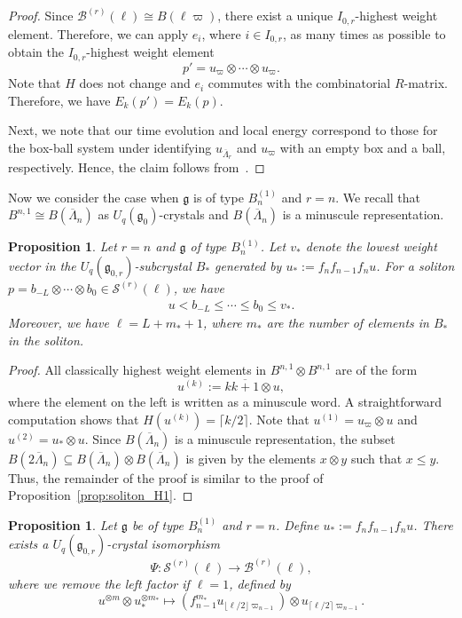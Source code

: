 \documentclass[reqno]{amsart}
\newcommand{\g}{\mathfrak{g}}
\newcommand{\clfw}{\overline{\Lambda}} %
\newcommand{\iso}{\cong}
\newcommand{\Sol}{\mathcal{S}} %
\theoremstyle{plain}
\newtheorem{prop}[thm]{Proposition}
\theoremstyle{definition}
\numberwithin{equation}{section}
\begin{document}
\begin{proof}
Since $\mathcal{B}^{(r)}(\ell) \iso B(\ell \varpi)$, there exist a unique $I_{0,r}$-highest weight element.
Therefore, we can apply $e_i$, where $i \in I_{0,r}$, as many times as possible to obtain the $I_{0,r}$-highest weight element
\[
p' = u_{\varpi} \otimes \cdots \otimes u_{\varpi}.
\]
Note that $H$ does not change and $e_i$ commutes with the combinatorial $R$-matrix.
Therefore, we have $E_k(p') = E_k(p)$.

Next, we note that our time evolution and local energy correspond to those for the box-ball system under identifying $u_{\clfw_r}$ and $u_{\varpi}$ with an empty box and a ball, respectively.
Hence, the claim follows from~\cite[Lemma~4.1]{FOY00}.
\end{proof}

Now we consider the case when $\g$ is of type $B_n^{(1)}$ and $r = n$.
We recall that $B^{n,1} \iso B(\clfw_n)$ as $U_q(\g_0)$-crystals and $B(\clfw_n)$ is a minuscule representation.

\begin{prop}
\label{prop:soliton_Bn}
Let $r = n$ and $\g$ of type $B_n^{(1)}$.
Let $v_*$ denote the lowest weight vector in the $U_q(\g_{0,r})$-subcrystal $B_*$ generated by $u_* := f_n f_{n-1} f_n u$.
For a soliton $p = b_{-L} \otimes \cdots \otimes b_0 \in \Sol^{(r)}(\ell)$, we have
\begin{align*}
u < b_{-L} \leq \cdots \leq b_0 \leq v_*.
\end{align*}
Moreover, we have $\ell = L + m_* + 1$, where $m_*$ are the number of elements in $B_*$ in the soliton. 
\end{prop}

\begin{proof}
All classically highest weight elements in $B^{n,1} \otimes B^{n,1}$ are of the form
\[
u^{(k)} := k \overline{k+1} \otimes u,
\]
where the element on the left is written as a minuscule word.
A straightforward computation shows that $H(u^{(k)}) = \lceil k / 2 \rceil$.
Note that $u^{(1)} = u_{\varpi} \otimes u$ and $u^{(2)} = u_* \otimes u$.
Since $B(\clfw_n)$ is a minuscule representation, the subset $B(2\clfw_n) \subseteq B(\clfw_n) \otimes B(\clfw_n)$ is given by the elements $x \otimes y$ such that $x \leq y$.
Thus, the remainder of the proof is similar to the proof of Proposition~\ref{prop:soliton_H1}.
\end{proof}

\begin{prop}
\label{prop:soliton_crystal_bijection_B}
Let $\g$ be of type $B_n^{(1)}$ and $r = n$.
Define $u_* := f_n f_{n-1} f_n u$.
There exists a $U_q(\g_{0,r})$-crystal isomorphism
\[
\Psi \colon \Sol^{(r)}(\ell) \to \mathcal{B}^{(r)}(\ell), %
\]
where we remove the left factor if $\ell = 1$,
defined by
\[
u^{\otimes m} \otimes u_*^{\otimes m_*} \mapsto (f_{n-1}^{m_*} u_{\lfloor \ell / 2 \rfloor \varpi_{n-1}}) \otimes u_{\lceil \ell / 2 \rceil \varpi_{n-1}}.
\]
\end{prop}
\end{document}
